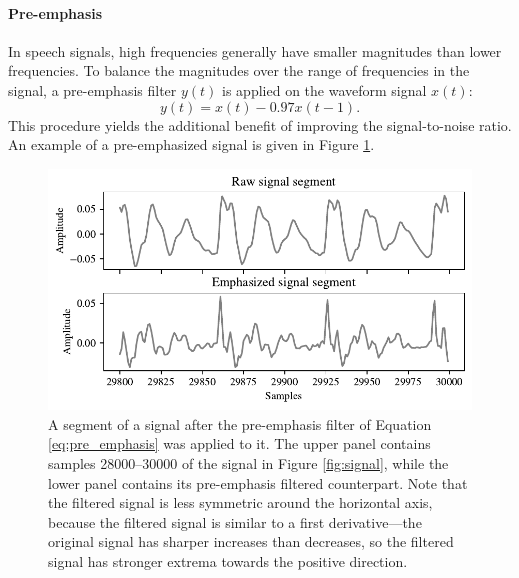 		\paragraph{Pre-emphasis}

			In speech signals, high frequencies generally have smaller magnitudes than lower frequencies.
			To balance the magnitudes over the range of frequencies in the signal, a pre-emphasis filter $y(t)$ is applied on the waveform signal $x(t)$:
			\begin{equation}\label{eq:pre_emphasis}
				y(t) = x(t) - 0.97x(t-1).
			\end{equation}
			This procedure yields the additional benefit of improving the signal-to-noise ratio.
			An example of a pre-emphasized signal is given in Figure \ref{fig:signalemph}.
			\begin{figure}[ht]
				\centering
			    \includegraphics[width=\linewidth]{gfx/signalemphpanels}
			    \caption[Pre-emphasis filtered signal segment]{A segment of a signal after the pre-emphasis filter of Equation \ref{eq:pre_emphasis} was applied to it. The upper panel contains samples 28000--30000 of the signal in Figure \ref{fig:signal}, while the lower panel contains its pre-emphasis filtered counterpart. Note that the filtered signal is less symmetric around the horizontal axis, because the filtered signal is similar to a first derivative---the original signal has sharper increases than decreases, so the filtered signal has stronger extrema towards the positive direction.}
			    \label{fig:signalemph}
			\end{figure}

